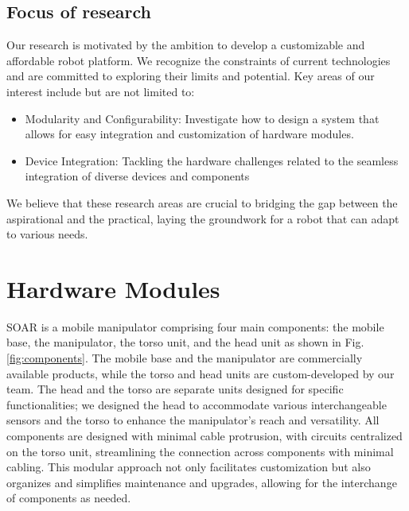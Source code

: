 \documentclass[runningheads,a4paper]{llncs}
\begin{document}
\subsection{Focus of research}
Our research is motivated by the ambition to develop a customizable and affordable robot platform.
We recognize the constraints of current technologies and are committed to exploring their limits and potential. Key areas of our interest include but are not limited to:
\begin{itemize}
	\item Modularity and Configurability: Investigate how to design a system that allows for easy integration and customization of hardware modules.
	\item Device Integration: Tackling the hardware challenges related to the seamless integration of diverse devices and components
\end{itemize}
We believe that these research areas are crucial to bridging the gap between the aspirational and the practical, laying the groundwork for a robot that can adapt to various needs.

\section{Hardware Modules}
SOAR is a mobile manipulator comprising four main components: the mobile base, the manipulator, the torso unit, and the head unit as shown in Fig. \ref{fig:components}.
The mobile base and the manipulator are commercially available products, while the torso and head units are custom-developed by our team.
The head and the torso are separate units designed for specific functionalities; we designed the head to accommodate various interchangeable sensors and the torso to enhance the manipulator's reach and versatility.
All components are designed with minimal cable protrusion, with circuits centralized on the torso unit, streamlining the connection across components with minimal cabling.
This modular approach not only facilitates customization but also organizes and simplifies maintenance and upgrades, allowing for the interchange of components as needed.
\end{document}
